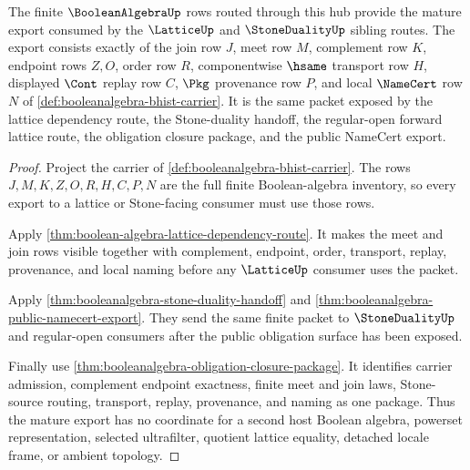 \begin{theorem}
\label{thm:boolean-algebra-mature-export}
The finite $\BooleanAlgebraUp$ rows routed through this hub provide the mature export consumed by the $\LatticeUp$ and $\StoneDualityUp$ sibling routes. The export consists exactly of the join row $J$, meet row $M$, complement row $K$, endpoint rows $Z,O$, order row $R$, componentwise $\hsame$ transport row $H$, displayed $\Cont$ replay row $C$, $\Pkg$ provenance row $P$, and local $\NameCert$ row $N$ of \autoref{def:booleanalgebra-bhist-carrier}. It is the same packet exposed by the lattice dependency route, the Stone-duality handoff, the regular-open forward lattice route, the obligation closure package, and the public NameCert export.
\end{theorem}
\begin{proof}
Project the carrier of \autoref{def:booleanalgebra-bhist-carrier}. The rows $J,M,K,Z,O,R,H,C,P,N$ are the full finite Boolean-algebra inventory, so every export to a lattice or Stone-facing consumer must use those rows.

Apply \autoref{thm:boolean-algebra-lattice-dependency-route}. It makes the meet and join rows visible together with complement, endpoint, order, transport, replay, provenance, and local naming before any $\LatticeUp$ consumer uses the packet.

Apply \autoref{thm:booleanalgebra-stone-duality-handoff} and \autoref{thm:booleanalgebra-public-namecert-export}. They send the same finite packet to $\StoneDualityUp$ and regular-open consumers after the public obligation surface has been exposed.

Finally use \autoref{thm:booleanalgebra-obligation-closure-package}. It identifies carrier admission, complement endpoint exactness, finite meet and join laws, Stone-source routing, transport, replay, provenance, and naming as one package. Thus the mature export has no coordinate for a second host Boolean algebra, powerset representation, selected ultrafilter, quotient lattice equality, detached locale frame, or ambient topology.
\end{proof}
